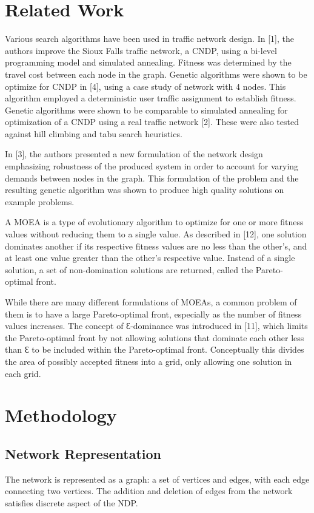 \documentclass[11pt, oneside, notitlepage, draft]{article}
\begin{document}
\section{Related Work}
    Various search algorithms have been used in traffic network design.  In [1], the authors improve the Sioux Falls traffic network, a CNDP, using a bi-level programming model and simulated annealing. Fitness was determined by the travel cost between each node in the graph. Genetic algorithms were shown to be optimize for CNDP in [4], using a case study of network with 4 nodes. This algorithm employed a deterministic user traffic assignment to establish fitness.  Genetic algorithms were shown to be comparable to simulated annealing for optimization of a CNDP using a real traffic network [2]. These were also tested against hill climbing and tabu search heuristics.

    In [3], the authors presented a new formulation of the network design emphasizing robustness of the produced system in order to account for varying demands between nodes in the graph. This formulation of the problem and the resulting genetic algorithm was shown to produce high quality solutions on example problems.

    A MOEA is a type of evolutionary algorithm to optimize for one or more fitness values without reducing them to a single value. As described in [12], one solution dominates another if its respective fitness values are no less than the other's, and at least one value greater than the other's respective value. Instead of a single solution, a set of non-domination solutions are returned, called the Pareto-optimal front.

    While there are many different formulations of MOEAs, a common problem of them is to have a large Pareto-optimal front, especially as the number of fitness values increases. The concept of  Ɛ-dominance was introduced in [11], which limits the Pareto-optimal front by not allowing solutions that dominate each other less than Ɛ to be included within the Pareto-optimal front. Conceptually this divides the area of possibly accepted fitness into a grid, only allowing one solution in each grid.
\section{Methodology}
    \subsection{Network Representation}
        The network is represented as a graph: a set of vertices and edges, with each edge connecting two vertices. The addition and deletion of edges from the network satisfies discrete aspect of the NDP.
\end{document}
